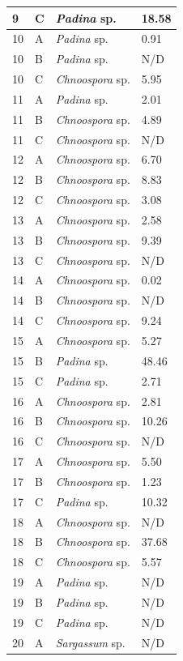 \documentclass[10pt,letterpaper]{article}
\begin{document}
\begin{longtable}{ | p{2cm} | p{2cm} | p{3cm} | p{3.5cm} |}
\hline
9&C&\emph{Padina} sp. 
&18.58 
\\
\hline
10&A&\emph{Padina} sp. 
&0.91
\\
\hline
10&B&\emph{Padina} sp. 
&N/D\\
\hline
10&C&\emph{Chnoospora} sp.&5.95
\\
\hline
11&A&\emph{Padina} sp. 
&2.01 %
\\
\hline
11&B&\emph{Chnoospora} sp.&4.89
\\
\hline
11&C&\emph{Chnoospora} sp.&N/D\\
\hline
12&A&\emph{Chnoospora} sp.&6.70\\
\hline
12&B&\emph{Chnoospora} sp.&8.83
\\
\hline
12&C&\emph{Chnoospora} sp.&3.08
\\
\hline
13&A&\emph{Chnoospora} sp.&2.58 
\\
\hline
13&B&\emph{Chnoospora} sp.&9.39
\\
\hline
13&C& 
\emph{Chnoospora} sp.&N/D\\
\hline
14&A&\emph{Chnoospora }sp.&0.02
\\
\hline
14&B&\emph{Chnoospora} sp.&N/D\\
\hline
14&C&\emph{Chnoospora }sp.&9.24
\\
\hline
15&A&\emph{Chnoospora }sp.&5.27
\\
\hline
15&B&\emph{Padina} sp. 
&48.46
\\
\hline
15&C&\emph{Padina} sp.
&2.71
\\
\hline
16&A&
\emph{Chnoospora }sp.&2.81
\\
\hline
16&B& 
\emph{Chnoospora }sp.&10.26
\\
\hline
16&C&\emph{Chnoospora }sp.&N/D\\
\hline
17&A& 
\emph{Chnoospora} sp.&5.50
\\
\hline
17&B&\emph{Chnoospora }sp.&1.23
\\
\hline
17&C&\emph{Padina} sp.&10.32
\\
\hline
18&A&\emph{Chnoospora }sp.&N/D\\
\hline
18&B&\emph{Chnoospora} sp.&37.68
\\
\hline
18&C&\emph{Chnoospora} sp.&5.57
\\
\hline
19&A&\emph{Padina} sp.&N/D\\
\hline
19&B&\emph{Padina} sp.&N/D\\
\hline
19&C&\emph{Padina} sp.&N/D\\
\hline
20
&A&\emph{Sargassum} sp.&N/D\\
\hline

\end{longtable}
\end{document}
